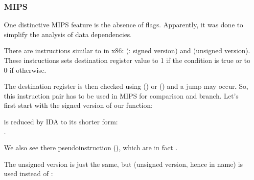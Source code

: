 ﻿\subsubsection{MIPS}

One distinctive MIPS feature is the absence of flags.
Apparently, it was done to simplify the analysis of data dependencies.


There are instructions similar to  in x86:  (: signed version) and 
 (unsigned version).
These instructions sets destination register value to 1 if the condition is true or to 0 if otherwise.


The destination register is then checked using  () or  () 
and a jump may occur.
So, this instruction pair has to be used in MIPS for comparison and branch.
Let's first start with the signed version of our function:



 is reduced by IDA to its 
shorter form:\\
.

We also see there  pseudoinstruction (), 
which are in fact .


The unsigned version is just the same, but  (unsigned version, hence  in name) is used instead of :



